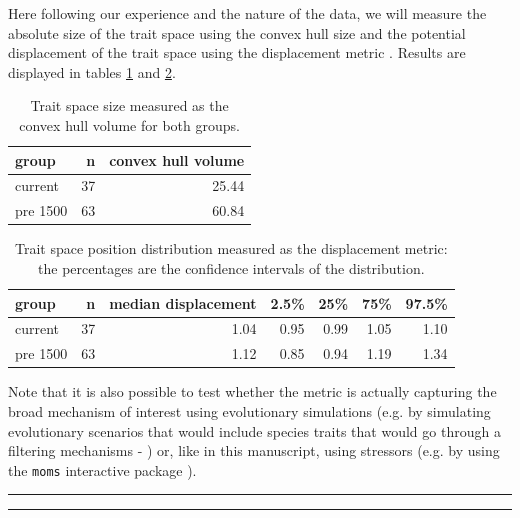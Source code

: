 \documentclass[12pt,letterpaper]{article}
\begin{document}
Here following our experience and the nature of the data, we will measure the absolute size of the trait space using the convex hull size and the potential displacement of the trait space using the displacement metric \citep{guillerme2020shifting}.
Results are displayed in tables \ref{Tab:results_convhull} and \ref{Tab:displacement}.

\begin{table}[ht]
\centering
\begin{tabular}{lrr}
  \hline
 group & n & convex hull volume \\ 
  \hline
 current &  37 & 25.44 \\ 
 pre 1500 &  63 & 60.84 \\ 
   \hline
\end{tabular}
\caption{Trait space size measured as the convex hull volume for both groups.}
\label{Tab:results_convhull}
\end{table}

\begin{table}[ht]
\centering
\begin{tabular}{lrrrrrr}
  \hline
 group & n & median displacement & 2.5\% & 25\% & 75\% & 97.5\% \\ 
  \hline
 current &  37 & 1.04 & 0.95 & 0.99 & 1.05 & 1.10 \\ 
 pre 1500 &  63 & 1.12 & 0.85 & 0.94 & 1.19 & 1.34 \\ 
   \hline
\end{tabular}
\caption{Trait space position distribution measured as the displacement metric: the percentages are the confidence intervals of the distribution.}
\label{Tab:displacement}
\end{table}

Note that it is also possible to test whether the metric is actually capturing the broad mechanism of interest using evolutionary simulations (e.g. by simulating evolutionary scenarios that would include species traits that would go through a filtering mechanisms - \citealt{guillerme2024treats}) or, like in this manuscript, using stressors (e.g. by using the \texttt{moms} interactive package \citealt{guillerme2020shifting}).


\bigskip
\bigskip
\hrule
\hrule
\end{document}
